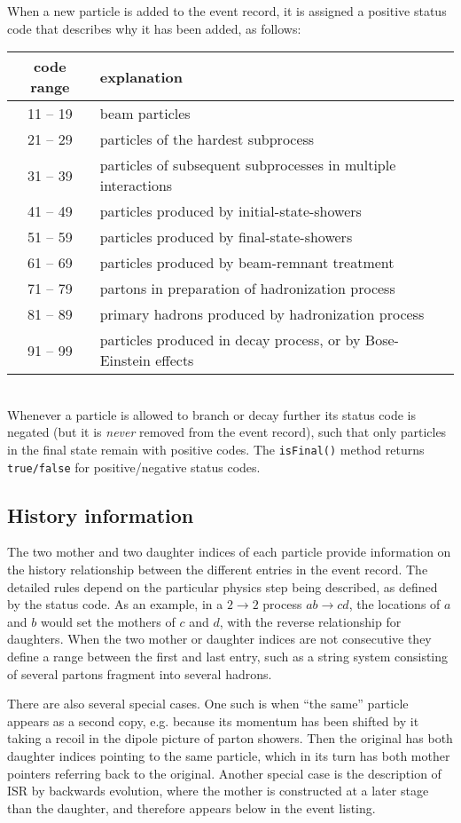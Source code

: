 \documentclass[12pt,a4paper]{article}
\begin{document}
When a new particle is added to the event record, it is assigned 
a positive status code that describes why it has been added, 
as follows:\\[2mm] 
\begin{tabular}{|c|l|}
\hline
code range & explanation \\
\hline
11 -- 19 & beam particles\\
21 -- 29 & particles of the hardest subprocess\\
31 -- 39 & particles of subsequent subprocesses in multiple interactions\\
41 -- 49 & particles produced by initial-state-showers\\
51 -- 59 & particles produced by final-state-showers\\
61 -- 69 & particles produced by beam-remnant treatment\\
71 -- 79 & partons in preparation of hadronization process\\
81 -- 89 & primary hadrons produced by hadronization process\\
91 -- 99 & particles produced in decay process, or by Bose-Einstein effects\\ 
\hline
\end{tabular}\\[2mm]
Whenever a particle is allowed to branch or decay further its status 
code is negated (but it is \textit{never} removed from the event record), 
such that only particles in the final state remain with positive codes. The
\texttt{isFinal()} method returns \texttt{true/false} for
positive/negative status codes.

\subsection{History information}

The two mother and two daughter indices of each particle provide 
information on the history relationship between the different entries 
in the event record. The detailed rules depend on the particular physics 
step being described, as defined by the status code. As an example, 
in a $2 \to 2$ process $a b \to c d$, the locations of $a$ and $b$
would set the mothers of $c$ and $d$, with the reverse relationship
for daughters. When the two mother or daughter indices are not
consecutive they define a range between the first and last entry,
such as a string system consisting of several partons fragment into
several hadrons.

There are also several special cases. One such is when ``the same''
particle appears as a second copy, e.g. because its momentum has 
been shifted by it taking a recoil in the dipole picture of parton
showers. Then the original has both daughter indices pointing to the
same particle, which in its turn has both mother pointers referring
back to the original. Another special case is the description of 
ISR by backwards evolution, where the mother is constructed at a 
later stage than the daughter, and therefore appears below in the 
event listing. 
\end{document}
